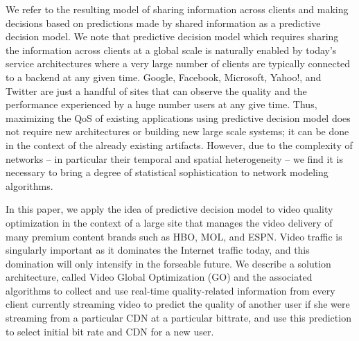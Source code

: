 We refer to the resulting model of sharing information across clients and making decisions based on predictions made by shared information as a predictive decision model. We note that predictive decision model which requires sharing the information across clients at a global scale is naturally enabled by today's service architectures where a very large number of clients are typically connected to a backend at any given time. Google, Facebook, Microsoft, Yahoo!, and Twitter are just a handful of sites that can observe the quality and the performance experienced by a huge number users at any give time. Thus, maximizing the QoS of existing applications using predictive decision model does not require new architectures or building new large scale systems; it can be done in the context of the already existing artifacts.  However, due to the complexity of networks -- in particular their temporal and spatial heterogeneity -- we find it is necessary to bring a degree of statistical sophistication to network modeling algorithms.

In this paper, we apply the idea of predictive decision model to video quality optimization in the context of a large site that manages the video delivery of many premium content brands such as HBO, MOL, and ESPN. Video traffic is singularly important as it dominates the Internet traffic today, and this domination will only intensify in the forseable future. We describe a solution architecture, called Video Global Optimization (GO) and the associated algorithms to collect and use real-time quality-related information from every client currently streaming video to predict the quality of another user if she were streaming from a particular CDN at a particular bittrate, and use this prediction to select initial bit rate and CDN for a new user.

